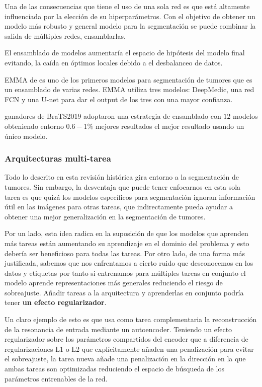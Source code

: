 			Una de las consecuencias que tiene el uso de una sola red es que está altamente influenciada por la elección de su hiperparámetros. Con el objetivo de obtener un modelo más robusto y general modelo para la segmentación se puede combinar la salida de múltiples redes, ensamblarlas.
			
			El ensamblado de modelos aumentaría el espacio de hipótesis del modelo final evitando, la caída en óptimos locales debido a el desbalanceo de datos.
			
			EMMA  de \cite{kamnitsas2018ensembles} es uno de los primeros modelos para segmentación de tumores que es un ensamblado de varias redes. EMMA utiliza tres modelos: DeepMedic, una red FCN y una U-net para dar el output de los tres con una mayor confianza.
			
			\cite{jiang2020two} ganadores de BraTS2019 adoptaron una estrategia de ensamblado con $12$ modelos obteniendo entorno $0.6 - 1 \%$ mejores resultados el mejor resultado usando un único modelo.
			
			\subsubsection{Arquitecturas multi-tarea}
			
			Todo lo descrito en esta revisión histórica gira entorno a la segmentación de tumores. Sin embargo, la desventaja que puede tener enfocarnos en esta sola tarea es que quizá los modelos específicos para segmentación ignoran información útil en las imágenes para otras tareas, que indirectamente pueda ayudar a obtener una mejor generalización en la segmentación de tumores. 
			
			Por un lado, esta idea radica en la suposición de que los modelos que aprenden más tareas están aumentando su aprendizaje en el dominio del problema y esto debería ser beneficioso para todas las tareas. Por otro lado, de una forma más justificada, sabemos que nos enfrentamos a cierto ruido que desconocemos en los datos y etiquetas por tanto si entrenamos para múltiples tareas en conjunto el modelo aprende representaciones más generales reduciendo el riesgo de sobreajuste. Añadir tareas a la arquitectura y aprenderlas en conjunto podría tener \textbf{un efecto regularizador}.
			
			Un claro ejemplo de esto es \cite{myronenko20193d} que usa como tarea complementaria la reconstrucción de la resonancia de entrada mediante un autoencoder. Teniendo un efecto regularizador sobre los parámetros compartidos del encoder que a diferencia de regularizaciones L1 o L2 que explícitamente añaden una penalización para evitar el sobreajuste, la tarea nueva añade una penalización en la dirección en la que ambas tareas son optimizadas reduciendo el espacio de búsqueda de los parámetros entrenables de la red.
			

